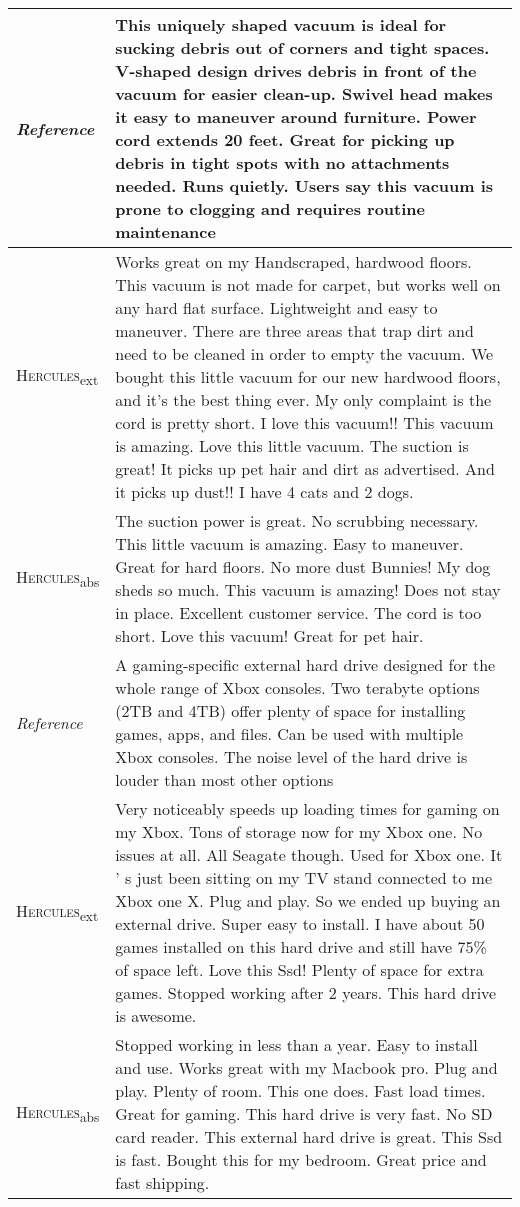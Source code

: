 \documentclass[11pt]{article}
\newcommand\Tstrut{\rule{0pt}{2.6ex}}         \newcommand\Bstrut{\rule[-1.6ex]{0pt}{0pt}}
\begin{document}
\begin{table*}[ht]
\begin{tabular}{@{}m{2cm}@{~}|@{~}m{13.5cm}@{}}
\textit{Reference} & \Tstrut This uniquely shaped vacuum is ideal for sucking debris out of corners and tight spaces. V-shaped design drives debris in front of the vacuum for easier clean-up. Swivel head makes it easy to maneuver around furniture. Power cord extends 20 feet. Great for picking up debris in tight spots with no attachments needed. Runs quietly. Users say this vacuum is prone to clogging and requires routine maintenance \\
\hline
\textsc{Hercules}\textsubscript{ext} & Works great on my Handscraped, hardwood floors. This vacuum is not made for carpet, but works well on any hard flat surface. Lightweight and easy to maneuver. There are three areas that trap dirt and need to be cleaned in order to empty the vacuum. We bought this little vacuum for our new hardwood floors, and it's the best thing ever. My only complaint is the cord is pretty short. I love this vacuum!! This vacuum is amazing. Love this little vacuum. The suction is great! It picks up pet hair and dirt as advertised. And it picks up dust!! I have 4 cats and 2 dogs. \\
\hline
\textsc{Hercules}\textsubscript{abs} & The suction power is great. No scrubbing necessary. This little vacuum is amazing. Easy to maneuver. Great for hard floors. No more dust Bunnies! My dog sheds so much. This vacuum is amazing! Does not stay in place. Excellent customer service. The cord is too short. Love this vacuum! Great for pet hair. \Bstrut\\

\hline\hline 



\textit{Reference} & \Tstrut A gaming-specific external hard drive designed for the whole range of Xbox consoles. Two terabyte options (2TB and 4TB) offer plenty of space for installing games, apps, and files. Can be used with multiple Xbox consoles. The noise level of the hard drive is louder than most other options \\
\hline
\textsc{Hercules}\textsubscript{ext} & Very noticeably speeds up loading times for gaming on my Xbox. Tons of storage now for my Xbox one. No issues at all. All Seagate though. Used for Xbox one. It ’ s just been sitting on my TV stand connected to me Xbox one X. Plug and play. So we ended up buying an external drive. Super easy to install. I have about 50 games installed on this hard drive and still have 75\% of space left. Love this Ssd! Plenty of space for extra games. Stopped working after 2 years. This hard drive is awesome. \\
\hline
\textsc{Hercules}\textsubscript{abs} & Stopped working in less than a year. Easy to install and use. Works great with my Macbook pro. Plug and play. Plenty of room. This one does. Fast load times. Great for gaming. This hard drive is very fast. No SD card reader. This external hard drive is great. This Ssd is fast. Bought this for my bedroom. Great price and fast shipping. \Bstrut \\


\end{tabular}
\end{table*}
\end{document}
